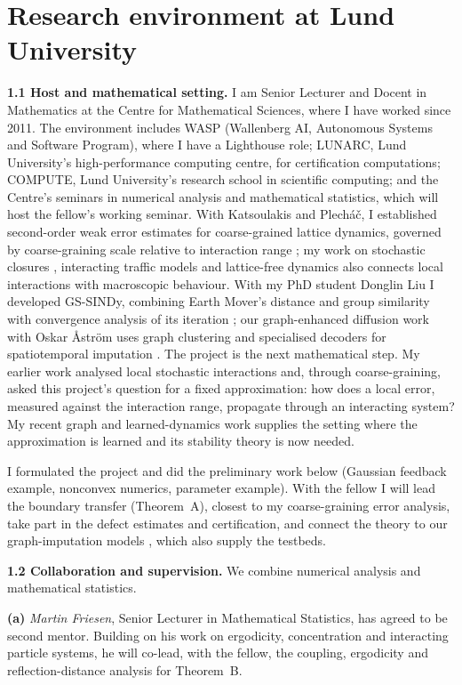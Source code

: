 \documentclass[12pt,a4paper]{article}
\begin{document}
\section{Research environment at Lund University}
\textbf{1.1 Host and mathematical setting.}
I am Senior Lecturer and Docent in Mathematics at the Centre for Mathematical Sciences, where I have worked since 2011. The environment includes WASP (Wallenberg AI, Autonomous Systems and Software Program), where I have a Lighthouse role; LUNARC, Lund University's high-performance computing centre, for certification computations; COMPUTE, Lund University's research school in scientific computing; and the Centre's seminars in numerical analysis and mathematical statistics, which will host the fellow's working seminar. With Katsoulakis and Plech\'a\v{c}, I established second-order weak error estimates for coarse-grained lattice dynamics, governed by coarse-graining scale relative to interaction range \cite{KPS06}; my work on stochastic closures \cite{KMS05}, interacting traffic models \cite{SK06} and lattice-free dynamics \cite{Sop12} also connects local interactions with macroscopic behaviour. With my PhD student Donglin Liu I developed GS-SINDy, combining Earth Mover's distance and group similarity with convergence analysis of its iteration \cite{LS25}; our graph-enhanced diffusion work with Oskar \AA{}str\"om uses graph clustering and specialised decoders for spatiotemporal imputation \cite{LAS25}. The project is the next mathematical step. My earlier work analysed local stochastic interactions and, through coarse-graining, asked this project's question for a fixed approximation: how does a local error, measured against the interaction range, propagate through an interacting system? My recent graph and learned-dynamics work supplies the setting where the approximation is learned and its stability theory is now needed.

I formulated the project and did the preliminary work below (Gaussian feedback example, nonconvex numerics, parameter example). With the fellow I will lead the boundary transfer (Theorem~A), closest to my coarse-graining error analysis, take part in the defect estimates and certification, and connect the theory to our graph-imputation models \cite{LAS25}, which also supply the testbeds.

\textbf{1.2 Collaboration and supervision.}
We combine numerical analysis and mathematical statistics.

\textbf{(a)} \textit{Martin Friesen}, Senior Lecturer in Mathematical Statistics, has agreed to be second mentor. Building on his work on ergodicity, concentration and interacting particle systems, he will co-lead, with the fellow, the coupling, ergodicity and reflection-distance analysis for Theorem~B.
\end{document}
